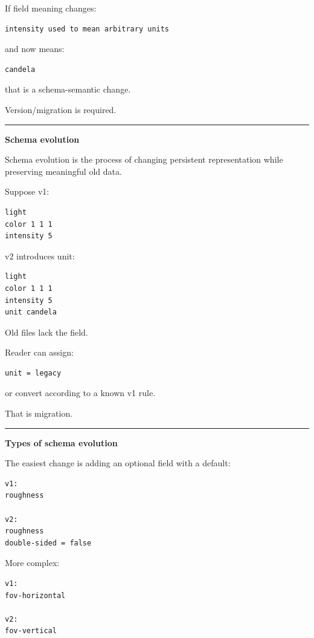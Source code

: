 If field meaning changes:

\begin{verbatim}
intensity used to mean arbitrary units
\end{verbatim}

and now means:

\begin{verbatim}
candela
\end{verbatim}

that is a schema-semantic change.

Version/migration is required.

\begin{center}\rule{0.5\linewidth}{0.5pt}\end{center}

\textbf{Schema evolution}

Schema evolution is the process of changing persistent representation while preserving meaningful old data.

Suppose v1:

\begin{verbatim}
light
color 1 1 1
intensity 5
\end{verbatim}

v2 introduces unit:

\begin{verbatim}
light
color 1 1 1
intensity 5
unit candela
\end{verbatim}

Old files lack the field.

Reader can assign:

\begin{verbatim}
unit = legacy
\end{verbatim}

or convert according to a known v1 rule.

That is migration.

\begin{center}\rule{0.5\linewidth}{0.5pt}\end{center}

\textbf{Types of schema evolution}

The easiest change is adding an optional field with a default:

\begin{verbatim}
v1:
roughness

v2:
roughness
double-sided = false
\end{verbatim}

More complex:

\begin{verbatim}
v1:
fov-horizontal

v2:
fov-vertical
\end{verbatim}


